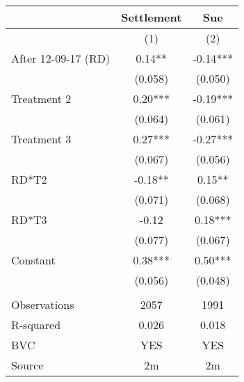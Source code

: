 \begin{tabular}{lcc}
\toprule
      & Settlement & Sue \\
\midrule
      & (1)   & (2) \\
\midrule
\midrule
After 12-09-17 (RD) & 0.14** & -0.14*** \\
      & (0.058) & (0.050) \\
Treatment 2 & 0.20*** & -0.19*** \\
      & (0.064) & (0.061) \\
Treatment 3 & 0.27*** & -0.27*** \\
      & (0.067) & (0.056) \\
RD*T2 & -0.18** & 0.15** \\
      & (0.071) & (0.068) \\
RD*T3 & -0.12 & 0.18*** \\
      & (0.077) & (0.067) \\
Constant & 0.38*** & 0.50*** \\
      & (0.056) & (0.048) \\
      &       &  \\
\midrule
Observations & 2057  & 1991 \\
R-squared & 0.026 & 0.018 \\
BVC   & YES   & YES \\
Source & 2m    & 2m \\
\bottomrule
\bottomrule
\end{tabular}%
